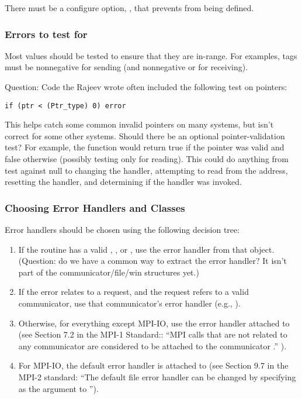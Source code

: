 \documentclass{article}
\begin{document}
There must be a configure option,
,  
that prevents  from being defined.

\subsubsection{Errors to test for}
Most values should be tested to ensure that they are in-range.  For examples,
tags must be nonnegative for sending (and nonnegative or
 for receiving). 

Question: Code the Rajeev wrote often included the following test on pointers:
\begin{verbatim}
if (ptr < (Ptr_type) 0) error
\end{verbatim}
This helps catch some common invalid pointers on many systems, but isn't
correct for some other systems.  Should there be an optional
pointer-validation test?  For example, the function
 would return true if the pointer was valid and
false otherwise (possibly testing only for reading).  This could do anything
from test against null to changing the  handler, attempting to
read from the address, resetting the handler, and determining if the handler
was invoked.  

\subsubsection{Choosing Error Handlers and Classes}
Error handlers should be chosen using the following decision tree:
\begin{enumerate}
\item If the routine has a valid , , or
  , use the error handler from that object.  (Question: do we
  have a common way to extract the error handler?  It isn't part of the
  communicator/file/win structures yet.)
\item If the error relates to a request, and the request refers to a valid
  communicator, use that communicator's error handler (e.g., ).
\item Otherwise, for everything except MPI-IO, use the error handler attached
  to   
  (see Section 7.2 in the MPI-1 Standard:: ``MPI calls that are not related to
  any communicator are considered to be attached to the communicator
  .'' ).
\item For MPI-IO, the default error handler is attached to
   (see Section 9.7 in the MPI-2 standard: ``The default
  file error handler can be changed by specifying  as the
   argument to ''). 
\end{enumerate}
\end{document}
